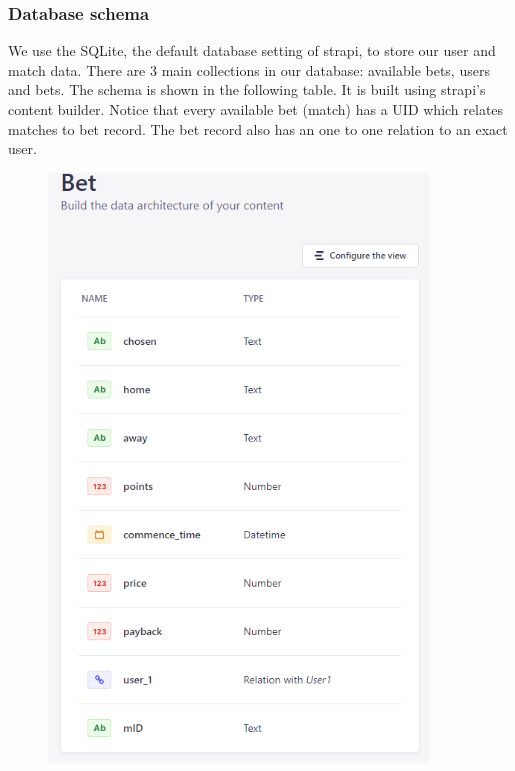 \documentclass[singlecolumn]{article}
\begin{document}
\subsubsection{Database schema}


We use the SQLite, the default database setting of strapi, to store our user and match data. There are 3 main collections in our database: available bets, users and bets. The schema is shown in the following table. It is built using strapi's content builder. Notice that every available bet (match) has a UID which relates matches to bet record. The bet record also has an one to one relation to an exact user.


\begin{figure}[H]
    \centering
    \begin{minipage}[c]{0.3\textwidth}
    \centering
    \includegraphics[width=0.9\textwidth]{BetSchema.png}
    \end{minipage}%

\end{figure}
\end{document}
